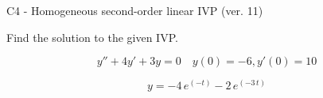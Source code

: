 \begin{exercise}
  \begin{exerciseTitle}C4 - Homogeneous second-order linear IVP (ver. 11)\end{exerciseTitle}
  \begin{exerciseStatement}
    
Find the solution to the given IVP.

    
\[y''+4y'+3y = 0 \hspace{1em} y(0) = -6 , y'(0) = 10\]

  \end{exerciseStatement}
  \begin{exerciseAnswer}
    
\[y= -4 \, e^{\left(-t\right)} - 2 \, e^{\left(-3 \, t\right)}\]

  \end{exerciseAnswer}
\end{exercise}